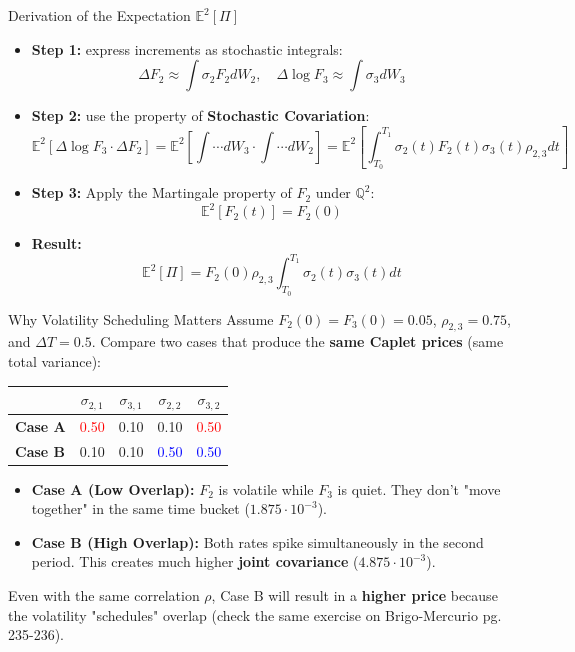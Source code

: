 \documentclass{beamer}
\begin{document}
\begin{frame}{Derivation of the Expectation $\mathbb{E}^2[\Pi]$}
	\begin{itemize}
		\item \textbf{Step 1:} express increments as stochastic integrals:
		\[ \Delta F_2 \approx \int \sigma_2 F_2 dW_2, \quad \Delta \log F_3 \approx \int \sigma_3 dW_3 \]
		\item \textbf{Step 2:} use the property of \textbf{Stochastic Covariation}:
		\[ \mathbb{E}^2[\Delta \log F_3 \cdot \Delta F_2] =
		\mathbb{E}^2 \left[ \int \cdots dW_3 \cdot \int \cdots dW_2 \right] =
		\mathbb{E}^2 \left[ \int_{T_0}^{T_1} \sigma_2(t) F_2(t) \sigma_3(t) \rho_{2,3} dt \right] \]
		\item \textbf{Step 3:} Apply the Martingale property of $F_2$ under $\mathbb{Q}^2$:
		\[ \mathbb{E}^2[F_2(t)] = F_2(0) \]
		\item \textbf{Result:}
		\[ \mathbb{E}^2[\Pi] = F_2(0) \rho_{2,3} \int_{T_0}^{T_1} \sigma_2(t) \sigma_3(t) dt \]
	\end{itemize}
\end{frame}

\begin{frame}{Why Volatility Scheduling Matters}
	Assume $F_2(0)=F_3(0)=0.05$, $\rho_{2,3}=0.75$, and $\Delta T = 0.5$.
	Compare two cases that produce the \textbf{same Caplet prices} (same total variance):
	
	\vspace{0.4cm}
	\begin{center}
		\renewcommand{\arraystretch}{1.2}
		\begin{tabular}{lcccc}
			\toprule
			& \textbf{$\sigma_{2,1}$} & \textbf{$\sigma_{3,1}$} & \textbf{$\sigma_{2,2}$} & \textbf{$\sigma_{3,2}$} \\
			\midrule
			\textbf{Case A} & \textcolor{red}{0.50} & 0.10 & 0.10 & \textcolor{red}{0.50} \\
			\textbf{Case B} & 0.10 & 0.10 & \textcolor{blue}{0.50} & \textcolor{blue}{0.50} \\
			\bottomrule
		\end{tabular}
	\end{center}
	\vspace{0.4cm}
	
	\begin{itemize}
		\item \textbf{Case A (Low Overlap):} $F_2$ is volatile while $F_3$ is quiet. They don't "move together" in the same time bucket ($1.875\cdot 10^{-3}$).
		\item \textbf{Case B (High Overlap):} Both rates spike simultaneously in the second period. This creates much higher \textbf{joint covariance} ($4.875\cdot 10^{-3}$).
	\end{itemize}
	
	Even with the same correlation $\rho$, Case B will result in a \textbf{higher price} because the volatility "schedules" overlap (check the same exercise on Brigo-Mercurio pg. 235-236).
\end{frame}
\end{document}
